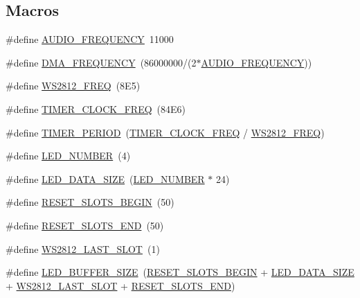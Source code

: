 \subsection*{Macros}
\begin{DoxyCompactItemize}
\item 
\#define \hyperlink{group___constant_gaae969438a57a86fddf0cf53106c9b6b4}{A\+U\+D\+I\+O\+\_\+\+F\+R\+E\+Q\+U\+E\+N\+CY}~11000
\item 
\#define \hyperlink{group___constant_ga644d7863b10926e5fb77205f294e1964}{D\+M\+A\+\_\+\+F\+R\+E\+Q\+U\+E\+N\+CY}~(86000000/(2$\ast$\hyperlink{group___constant_gaae969438a57a86fddf0cf53106c9b6b4}{A\+U\+D\+I\+O\+\_\+\+F\+R\+E\+Q\+U\+E\+N\+CY}))
\item 
\#define \hyperlink{group___constant_ga857df980c46f31dbe009560d826413a8}{W\+S2812\+\_\+\+F\+R\+EQ}~(8\+E5)
\item 
\#define \hyperlink{group___constant_ga5f1fac9f0aaabad0683c04e44a1aefe9}{T\+I\+M\+E\+R\+\_\+\+C\+L\+O\+C\+K\+\_\+\+F\+R\+EQ}~(84\+E6)
\item 
\#define \hyperlink{group___constant_gad888acf7c13a4bedd6541ceb5cf9bf6d}{T\+I\+M\+E\+R\+\_\+\+P\+E\+R\+I\+OD}~(\hyperlink{group___constant_ga5f1fac9f0aaabad0683c04e44a1aefe9}{T\+I\+M\+E\+R\+\_\+\+C\+L\+O\+C\+K\+\_\+\+F\+R\+EQ} / \hyperlink{group___constant_ga857df980c46f31dbe009560d826413a8}{W\+S2812\+\_\+\+F\+R\+EQ})
\item 
\#define \hyperlink{group___constant_ga306db1a2fccc9c26ad114b50a88940d3}{L\+E\+D\+\_\+\+N\+U\+M\+B\+ER}~(4)
\item 
\#define \hyperlink{group___constant_ga7af472c9efcf021651c589bb54d103fa}{L\+E\+D\+\_\+\+D\+A\+T\+A\+\_\+\+S\+I\+ZE}~(\hyperlink{group___constant_ga306db1a2fccc9c26ad114b50a88940d3}{L\+E\+D\+\_\+\+N\+U\+M\+B\+ER} $\ast$ 24)
\item 
\#define \hyperlink{group___constant_ga38b56d14857b32e86b876a32957a2b63}{R\+E\+S\+E\+T\+\_\+\+S\+L\+O\+T\+S\+\_\+\+B\+E\+G\+IN}~(50)
\item 
\#define \hyperlink{group___constant_ga91e46b7f75ff75a4719a9d7f589df5a3}{R\+E\+S\+E\+T\+\_\+\+S\+L\+O\+T\+S\+\_\+\+E\+ND}~(50)
\item 
\#define \hyperlink{group___constant_gacbccf04b27120fd8ba0a8eae7866291f}{W\+S2812\+\_\+\+L\+A\+S\+T\+\_\+\+S\+L\+OT}~(1)
\item 
\#define \hyperlink{group___constant_ga398165d967d8a2c8ff57ddd0a081a5ff}{L\+E\+D\+\_\+\+B\+U\+F\+F\+E\+R\+\_\+\+S\+I\+ZE}~(\hyperlink{group___constant_ga38b56d14857b32e86b876a32957a2b63}{R\+E\+S\+E\+T\+\_\+\+S\+L\+O\+T\+S\+\_\+\+B\+E\+G\+IN} + \hyperlink{group___constant_ga7af472c9efcf021651c589bb54d103fa}{L\+E\+D\+\_\+\+D\+A\+T\+A\+\_\+\+S\+I\+ZE} + \hyperlink{group___constant_gacbccf04b27120fd8ba0a8eae7866291f}{W\+S2812\+\_\+\+L\+A\+S\+T\+\_\+\+S\+L\+OT} + \hyperlink{group___constant_ga91e46b7f75ff75a4719a9d7f589df5a3}{R\+E\+S\+E\+T\+\_\+\+S\+L\+O\+T\+S\+\_\+\+E\+ND})

\end{DoxyCompactItemize}
